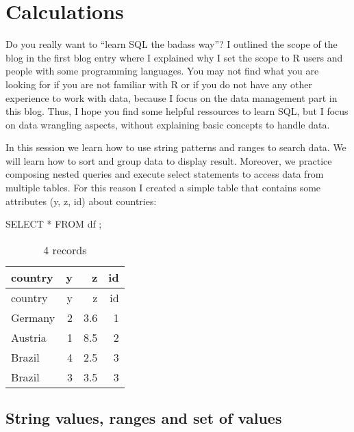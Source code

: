 \documentclass[
  letterpaper,
  DIV=11,
  numbers=noendperiod]{scrreprt}
\newenvironment{Shaded}{\begin{snugshade}}{\end{snugshade}}
\newcommand{\KeywordTok}[1]{\textcolor[rgb]{0.00,0.23,0.31}{#1}}
\newcommand{\NormalTok}[1]{\textcolor[rgb]{0.00,0.23,0.31}{#1}}
\newcommand{\OperatorTok}[1]{\textcolor[rgb]{0.37,0.37,0.37}{#1}}
\begin{document}

\hypertarget{calculations}{%
\chapter{Calculations}\label{calculations}}

Do you really want to ``learn SQL the badass way''? I outlined the scope
of the blog in the first blog entry where I explained why I set the
scope to R users and people with some programming languages. You may not
find what you are looking for if you are not familiar with R or if you
do not have any other experience to work with data, because I focus on
the data management part in this blog. Thus, I hope you find some
helpful ressources to learn SQL, but I focus on data wrangling aspects,
without explaining basic concepts to handle data.

In this session we learn how to use string patterns and ranges to search
data. We will learn how to sort and group data to display result.
Moreover, we practice composing nested queries and execute select
statements to access data from multiple tables. For this reason I
created a simple table that contains some attributes (y, z, id) about
countries:

\begin{Shaded}
\begin{Highlighting}[]
\KeywordTok{SELECT} \OperatorTok{*} \KeywordTok{FROM}\NormalTok{ df ;}
\end{Highlighting}
\end{Shaded}

\begin{longtable}[]{@{}lrrr@{}}
\caption{4 records}\tabularnewline
\toprule()
country & y & z & id \\
\midrule()
\endfirsthead
\toprule()
country & y & z & id \\
\midrule()
\endhead
Germany & 2 & 3.6 & 1 \\
Austria & 1 & 8.5 & 2 \\
Brazil & 4 & 2.5 & 3 \\
Brazil & 3 & 3.5 & 3 \\
\bottomrule()
\end{longtable}

\hypertarget{string-values-ranges-and-set-of-values}{%
\section{String values, ranges and set of
values}\label{string-values-ranges-and-set-of-values}}
\end{document}
